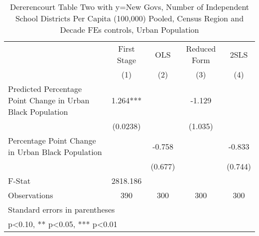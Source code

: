 \begin{table}[htbp]\centering
\def\sym#1{\ifmmode^{#1}\else\(^{#1}\)\fi}
\caption{Dererencourt Table Two with y=New Govs, Number of Independent School Districts Per Capita (100,000) Pooled, Census Region and Decade FEs controls, Urban Population}
\begin{tabular}{l*{4}{c}}
\toprule
                    & First Stage   &         OLS   &Reduced Form   &        2SLS   \\
                    &\multicolumn{1}{c}{(1)}   &\multicolumn{1}{c}{(2)}   &\multicolumn{1}{c}{(3)}   &\multicolumn{1}{c}{(4)}   \\
\midrule
Predicted Percentage Point Change in Urban Black Population&       1.264***&               &      -1.129   &               \\
                    &    (0.0238)   &               &     (1.035)   &               \\
\addlinespace
Percentage Point Change in Urban Black Population&               &      -0.758   &               &      -0.833   \\
                    &               &     (0.677)   &               &     (0.744)   \\
\midrule
F-Stat              &    2818.186   &               &               &               \\
Observations        &         390   &         300   &         300   &         300   \\
\bottomrule
\multicolumn{5}{l}{\footnotesize Standard errors in parentheses}\\
\multicolumn{5}{l}{\footnotesize * p<0.10, ** p<0.05, *** p<0.01}\\
\end{tabular}
\end{table}
